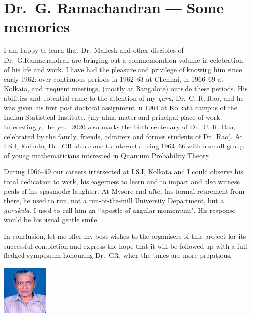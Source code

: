 \chapter{Dr.\ G. Ramachandran --- Some memories}\label{chap10}


\smallskip

I am happy to learn that Dr.\ Mallesh and other disciples of Dr.\ G.\break Ramachandran are bringing out a commemoration volume in celebration of his life
and work. I have had the pleasure and privilege of knowing him since early
1962: over continuous periods in 1962--63 at Chennai, in 1966--69 at Kolkata,
and frequent meetings, (mostly at Bangalore) outside these periods. His abilities and potential came 
to the attention of my \textit{guru}, Dr.\ C. R. Rao, and he was
given his first post doctoral assignment in 1964 at Kolkata campus of the Indian
Statistical Institute, (my alma mater and principal place of work. Interestingly,
the year 2020 also marks the birth centenary of Dr.\ C. R. Rao, celebrated by
the family, friends, admirers and former students of Dr.\ Rao). At I.S.I, Kolkata,
Dr.\ GR also came to interact during 1964--66 with a small group of young
mathematicians interested in Quantum Probability Theory.
\smallskip

During 1966--69 our careers intersected at I.S.I, Kolkata and I could observe
his total dedication to work, his eagerness to learn and to impart and also 
witness peals of his spasmodic laughter. At Mysore and after his formal retirement
from there, he used to run, not a run-of-the-mill University Department, but a
\textit{gurukula}. I used to call him an ``apostle of angular momentum". His response
would be his usual gentle smile.
\smallskip

In conclusion, let me offer my best wishes to the organisers of this project
for its successful completion and express the hope that it will be followed up
with a full-fledged symposium honouring Dr.\ GR, when the times are more
propitious.
\bigskip

\drawline
\bigskip

\centerline{\includegraphics[scale=4]{authorsphotos/Prof_B_Ramachandran.eps}}
\bigskip

